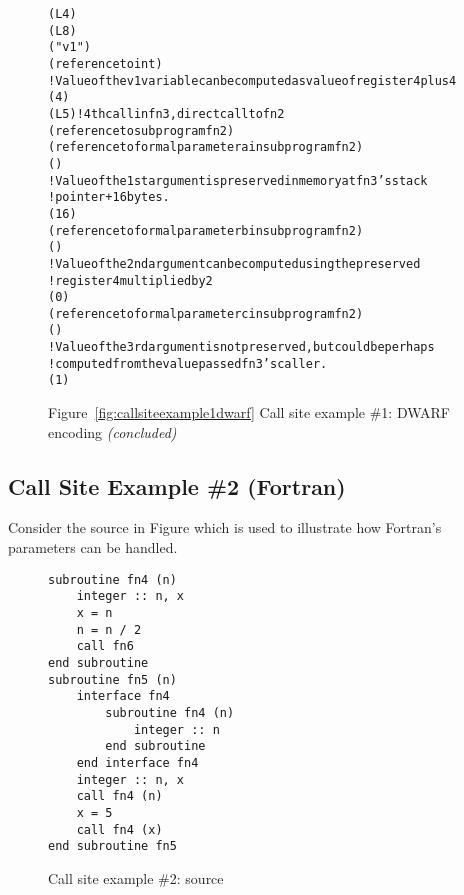 \begin{figure}
\begin{dwflisting}
\begin{alltt}
\DWTAGlexicalblock
    \DWATlowpc(L4)
    \DWAThighpc(L8)
    \DWTAGvariable
        \DWATname("v1")
        \DWATtype(reference to int)
        ! Value of the v1 variable can be computed as value of register 4 plus 4
        \DWATlocation(\DWOPbregfour{} 4 \DWOPstackvalue)
    \DWTAGcallsite
        \DWATcallreturnpc(L5) ! 4th call in fn3, direct call to fn2
        \DWATcalltarget(reference to subprogram fn2)
        \DWTAGcallsiteparameter
            \DWATcallparameter(reference to formal parameter a in subprogram fn2)
            \DWATlocation(\DWOPregzero)
            ! Value of the 1st argument is preserved in memory at fn3's stack 
            !   pointer + 16 bytes.
            \DWATcallvalue(\DWOPbregthree{} 16 \DWOPderef)
        \DWTAGcallsiteparameter
            \DWATcallparameter(reference to formal parameter b in subprogram fn2)
            \DWATlocation(\DWOPregone)
            ! Value of the 2nd argument can be computed using the preserved 
            !   register 4 multiplied by 2
            \DWATcallvalue(\DWOPlittwo{} \DWOPregfour{} 0 \DWOPmul)
        \DWTAGcallsiteparameter
            \DWATcallparameter(reference to formal parameter c in subprogram fn2)
            \DWATlocation(\DWOPregtwo)
            ! Value of the 3rd argument is not preserved, but could be perhaps 
            ! computed from the value passed fn3's caller.
            \DWATcallvalue(\DWOPentryvalue{} 1 \DWOPregzero)
\end{alltt}
\end{dwflisting}
\begin{center}
\vspace{3mm}
Figure~\ref{fig:callsiteexample1dwarf} Call site example \#1: DWARF encoding \textit{(concluded)}
\end{center}
\end{figure}

\clearpage
\subsection{Call Site Example \#2 (Fortran)}
Consider the  source in 
Figure 
which is used to illustrate how Fortran's 
parameters can be handled.

\begin{figure}[ht]
\begin{lstlisting}
subroutine fn4 (n)
    integer :: n, x
    x = n
    n = n / 2
    call fn6
end subroutine
subroutine fn5 (n)
    interface fn4
        subroutine fn4 (n)
            integer :: n
        end subroutine
    end interface fn4
    integer :: n, x
    call fn4 (n)
    x = 5
    call fn4 (x)
end subroutine fn5
\end{lstlisting}
\caption{Call site example \#2: source}
\label{fig:callsiteexample2source}
\end{figure}


